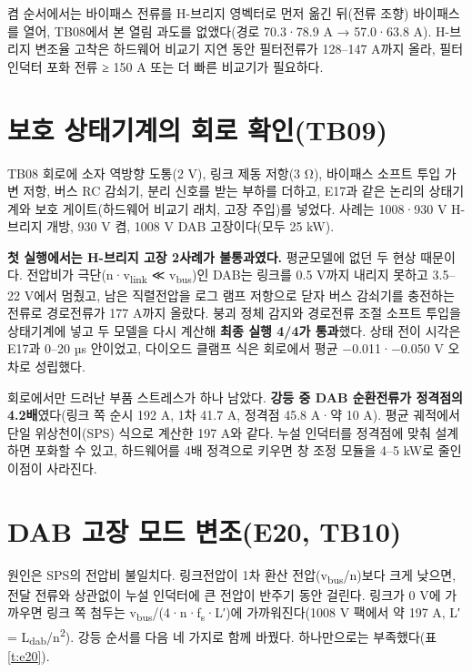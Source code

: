 켬 순서에서는 바이패스 전류를 H-브리지 영벡터로 먼저 옮긴 뒤(전류 조향) 바이패스를 열어, TB08에서 본 열림 과도를 없앴다(경로 70.3·78.9 A → 57.0·63.8 A). H-브리지 변조율 고착은 하드웨어 비교기 지연 동안 필터전류가 128–147 A까지 올라, 필터 인덕터 포화 전류 ≥ 150 A 또는 더 빠른 비교기가 필요하다.

\section{보호 상태기계의 회로 확인(TB09)}

TB08 회로에 소자 역방향 도통(2 V), 링크 제동 저항(3 Ω), 바이패스 소프트 투입 가변 저항, 버스 RC 감쇠기, 분리 신호를 받는 부하를 더하고, E17과 같은 논리의 상태기계와 보호 게이트(하드웨어 비교기 래치, 고장 주입)를 넣었다. 사례는 1008·930 V H-브리지 개방, 930 V 켬, 1008 V DAB 고장이다(모두 25 kW).

\textbf{첫 실행에서는 H-브리지 고장 2사례가 불통과였다.} 평균모델에 없던 두 현상 때문이다. 전압비가 극단(n·v\textsubscript{link} ≪ v\textsubscript{bus})인 DAB는 링크를 0.5 V까지 내리지 못하고 3.5–22 V에서 멈췄고, 남은 직렬전압을 로그 램프 저항으로 닫자 버스 감쇠기를 충전하는 전류로 경로전류가 177 A까지 올랐다. 붕괴 정체 감지와 경로전류 조절 소프트 투입을 상태기계에 넣고 두 모델을 다시 계산해 \textbf{최종 실행 4/4가 통과}했다. 상태 전이 시각은 E17과 0–20 µs 안이었고, 다이오드 클램프 식은 회로에서 평균 −0.011·−0.050 V 오차로 성립했다.

회로에서만 드러난 부품 스트레스가 하나 남았다. \textbf{강등 중 DAB 순환전류가 정격점의 4.2배}였다(링크 쪽 순시 192 A, 1차 41.7 A, 정격점 45.8 A·약 10 A). 평균 궤적에서 단일 위상천이(SPS) 식으로 계산한 197 A와 같다. 누설 인덕터를 정격점에 맞춰 설계하면 포화할 수 있고, 하드웨어를 4배 정격으로 키우면 창 조정 모듈을 4–5 kW로 줄인 이점이 사라진다.

\section{DAB 고장 모드 변조(E20, TB10)}

원인은 SPS의 전압비 불일치다. 링크전압이 1차 환산 전압(v\textsubscript{bus}/n)보다 크게 낮으면, 전달 전류와 상관없이 누설 인덕터에 큰 전압이 반주기 동안 걸린다. 링크가 0 V에 가까우면 링크 쪽 첨두는 v\textsubscript{bus}/(4·n·f\textsubscript{s}·L′)에 가까워진다(1008 V 팩에서 약 197 A, L′ = L\textsubscript{dab}/n\textsuperscript{2}). 강등 순서를 다음 네 가지로 함께 바꿨다. 하나만으로는 부족했다(표 \ref{t:e20}).

